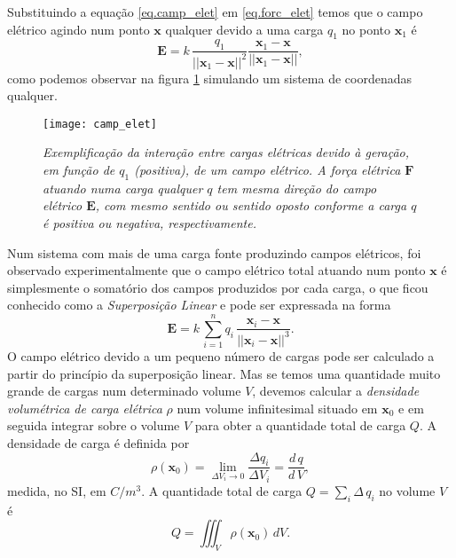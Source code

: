 Substituindo a equação \ref{eq.camp_elet} em \ref{eq.forc_elet} temos que o campo elétrico agindo num ponto $\textbf{x}$ qualquer devido a uma carga $q_1$ no ponto $\textbf{x}_1$ é
\begin{equation}\label{eq.campo_eletrico}
\textbf{E}=k\,\frac{q_1}{||\textbf{x}_1-\textbf{x}||^2}\frac{\textbf{x}_1-\textbf{x}}{||\textbf{x}_1-\textbf{x}||},
\end{equation}
como podemos observar na figura \ref{fig.camp_eletr} simulando um sistema de coordenadas qualquer.
\begin{figure}[!htb]
\centering
\texttt{[image: camp\_elet]}
\caption{\textit{Exemplificação da interação entre cargas elétricas devido à geração, em função de $q_1$ (positiva), de um campo elétrico. A força elétrica $\textbf{F}$ atuando numa carga qualquer $q$ tem mesma direção do campo elétrico $\textbf{E}$, com mesmo sentido ou sentido oposto conforme a carga $q$ é positiva ou negativa, respectivamente.}}
\label{fig.camp_eletr}
\end{figure}


Num sistema com mais de uma carga fonte produzindo campos elétricos, foi observado experimentalmente que o campo elétrico total atuando num ponto $\textbf{x}$ é simplesmente o somatório dos campos produzidos por cada carga, o que ficou conhecido como a \textit{Superposição Linear} e pode ser expressada na forma
\begin{equation*}
\textbf{E}=k\,\sum_{i=1}^{n}q_i\,\frac{\textbf{x}_i-\textbf{x}}{||\textbf{x}_i-\textbf{x}||^3}.
\end{equation*} 
O campo elétrico devido a um pequeno número de cargas pode ser calculado a partir do princípio da superposição linear. Mas se temos uma quantidade muito grande de cargas num determinado volume $V$, devemos calcular a \textit{densidade volumétrica de carga elétrica} $\rho$ num volume infinitesimal situado em $\textbf{x}_0$ e em seguida integrar sobre o volume $V$ para obter a quantidade total de carga $Q$. A densidade de carga é definida por
\begin{equation*}
\rho(\textbf{x}_0)=\lim_{\Delta V_i \to 0}\frac{\Delta q_i}{\Delta V_i}=\frac{d\,q}{d\,V},
\end{equation*}
medida, no SI, em $C/m^3$. A quantidade total de carga $Q=\sum_i \Delta\,q_i$ no volume $V$ é
\begin{equation}\label{eq.densidade_carga}
Q=\iiint_{V}\rho(\textbf{x}_0)\,dV.
\end{equation}

